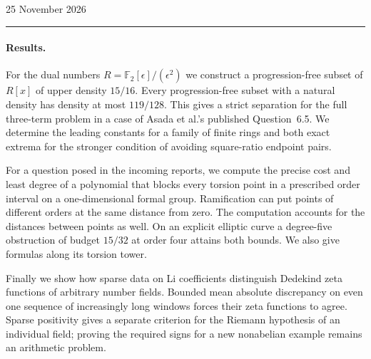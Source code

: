 \documentclass[11pt,letterpaper]{article}
\begin{document}
\thispagestyle{plain}
\hfill
{\sffamily\small 25 November 2026}\par
\vspace{0.55em}
\vspace{0.45em}
\par
\vspace{0.65em}
\noindent\textcolor{teal}{\rule{\linewidth}{0.8pt}}
\paragraph{Results.}
For the dual numbers $R=\mathbb F_2[\epsilon]/(\epsilon^2)$ we construct
a progression-free subset of $R[x]$ of upper density $15/16$.
Every progression-free subset with a natural density has density at most
$119/128$. This gives a strict separation for the full three-term problem
in a case of Asada et al.'s published Question~6.5. We determine the leading
constants for a family of finite rings and both exact extrema for the
stronger condition of avoiding square-ratio endpoint pairs.

For a question posed in the incoming reports, we compute the precise cost
and least degree of a polynomial that blocks every torsion point in a
prescribed order interval on a one-dimensional formal group. Ramification
can put points of different orders at the same distance from zero. The
computation accounts for the distances between points as well. On an
explicit elliptic curve a degree-five obstruction of budget $15/32$ at
order four attains both bounds. We also give formulas along its torsion tower.

Finally we show how sparse data on Li coefficients distinguish Dedekind
zeta functions of arbitrary number fields. Bounded mean absolute discrepancy on even one sequence of increasingly long windows forces their zeta functions to agree. Sparse positivity gives a separate
criterion for the Riemann hypothesis of an individual field; proving the
required signs for a new nonabelian example remains an arithmetic problem.
\end{document}
